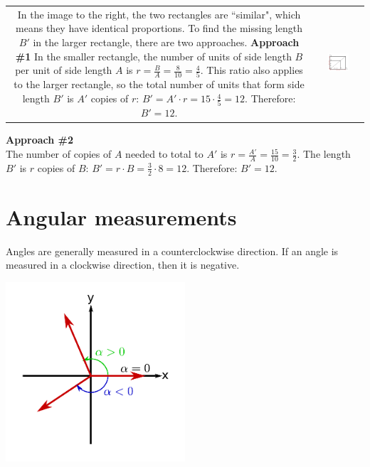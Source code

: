 \documentclass{article}
\begin{document}
\begin{tabular}{cc}
\parbox{0.4\textwidth}{
In the image to the right, the two rectangles are ``similar", which means they have identical proportions. 
To find the missing length \(B'\) in the larger rectangle, there are two approaches. \\
\textbf{Approach \#1} \\
In the smaller rectangle, the number of units of side length \(B\) per unit of side length \(A\) is \(r = \frac{B}{A} = \frac{8}{10} = \frac{4}{5}\). This ratio also applies to the larger rectangle, so the total number of units that form side length \(B'\) is \(A'\) copies of \(r\): \(B' = A' \cdot r = 15 \cdot \frac{4}{5} = 12\). Therefore: \(B' = 12\). 
} & 
\parbox{0.5\textwidth}{\includegraphics[width = 0.5\textwidth]{similar_rectangles}}
\end{tabular}

\textbf{Approach \#2} \\
The number of copies of \(A\) needed to total to \(A'\) is \(r = \frac{A'}{A} = \frac{15}{10} = \frac{3}{2}\). The length \(B'\) is \(r\) copies of \(B\): \(B' = r \cdot B = \frac{3}{2} \cdot 8 = 12\). Therefore: \(B' = 12\).



\section{Angular measurements}

Angles are generally measured in a counterclockwise direction. If an angle is measured in a clockwise direction, then it is negative.

\includegraphics[width = 0.5\textwidth]{standard_angle_positions}
\end{document}
